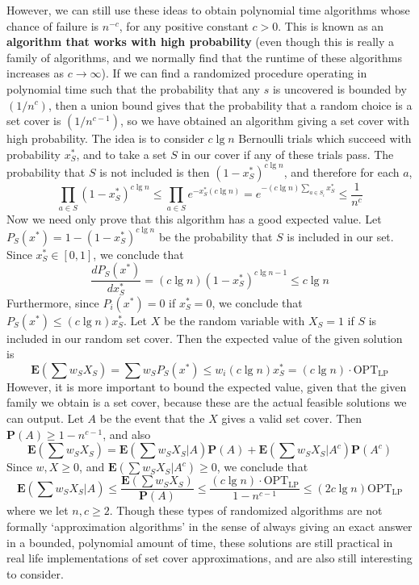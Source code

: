 However, we can still use these ideas to obtain polynomial time algorithms whose chance of failure is $n^{-c}$, for any positive constant $c > 0$. This is known as an {\bf algorithm that works with high probability} (even though this is really a family of algorithms, and we normally find that the runtime of these algorithms increases as $c \to \infty$). If we can find a randomized procedure operating in polynomial time such that the probability that any $s$ is uncovered is bounded by $(1/n^c)$, then a union bound gives that the probability that a random choice is a set cover is $(1/n^{c-1})$, so we have obtained an algorithm giving a set cover with high probability. The idea is to consider $c \lg n$ Bernoulli trials which succeed with probability $x^*_S$, and to take a set $S$ in our cover if any of these trials pass. The probability that $S$ is not included is then $(1 - x_S^*)^{c \lg n}$, and therefore for each $a$,
%
\[ \prod_{a \in S} (1 - x^*_S)^{c \lg n} \leq \prod_{a \in S} e^{-x_S^* (c \lg n)} = e^{- (c \lg n) \sum_{a \in S_i} x^*_S} \leq \frac{1}{n^c} \]
%
Now we need only prove that this algorithm has a good expected value. Let $P_S(x^*) = 1 - (1 - x_S^*)^{c \lg n}$ be the probability that $S$ is included in our set. Since $x_S^* \in [0,1]$, we conclude that
%
\[ \frac{d P_S(x^*)}{d x^*_S} = (c \lg n) (1 - x_S^*)^{c \lg n - 1} \leq c \lg n \]
%
Furthermore, since $P_i(x^*) = 0$ if $x^*_S = 0$, we conclude that $P_S(x^*) \leq (c \lg n) x_S^*$. Let $X$ be the random variable with $X_S = 1$ if $S$ is included in our random set cover. Then the expected value of the given solution is
%
\[ \mathbf{E} \left(\sum w_S X_S \right) = \sum w_S P_S(x^*) \leq w_i (c \lg n) x_S^* = (c \lg n) \cdot \text{OPT}_{\text{LP}} \]
%
However, it is more important to bound the expected value, given that the given family we obtain is a set cover, because these are the actual feasible solutions we can output. Let $A$ be the event that the $X$ gives a valid set cover. Then $\mathbf{P}(A) \geq 1 - n^{c-1}$, and also
%
\[ \mathbf{E} \left(\sum w_S X_S \right) = \mathbf{E} \left(\sum w_S X_S | A \right) \mathbf{P}(A) + \mathbf{E} \left(\sum w_S X_S | A^c \right) \mathbf{P}(A^c) \]
%
Since $w,X \geq 0$, and $\mathbf{E}(\sum w_S X_S | A^c) \geq 0$, we conclude that
%
\[ \mathbf{E} \left( \sum w_S X_S | A \right) \leq \frac{\mathbf{E} \left( \sum w_S X_S \right)}{\mathbf{P}(A)} \leq \frac{(c \lg n) \cdot \text{OPT}_{\text{LP}}}{1 - n^{c-1}} \leq (2 c \lg n) \text{OPT}_{\text{LP}} \]
%
where we let $n,c \geq 2$. Though these types of randomized algorithms are not formally `approximation algorithms' in the sense of always giving an exact answer in a bounded, polynomial amount of time, these solutions are still practical in real life implementations of set cover approximations, and are also still interesting to consider.

